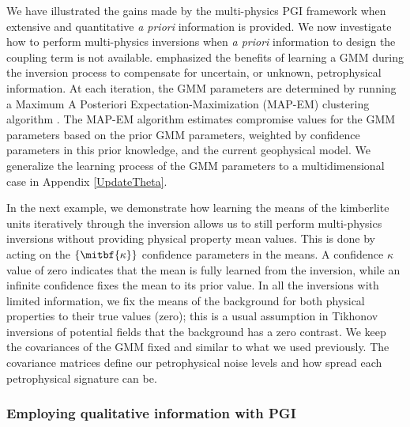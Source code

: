 \documentclass[extra, mreferee]{gji_joint} %
\begin{document}
We have illustrated the gains made by the multi-physics PGI framework when extensive and quantitative \textit{a priori} information is provided. We now investigate how to perform multi-physics inversions when \textit{a priori} information to design the coupling term is not available. \citet{ggz389} emphasized the benefits of learning a GMM during the inversion process to compensate for uncertain, or unknown, petrophysical information. At each iteration, the GMM parameters are determined by running a Maximum A Posteriori Expectation-Maximization (MAP-EM) clustering algorithm \citep{ExpectationMaximization}. The MAP-EM algorithm estimates compromise values for the GMM parameters based on the prior GMM parameters, weighted by confidence parameters in this prior knowledge, and the current geophysical model. We generalize the learning process of the GMM parameters to a multidimensional case in Appendix \ref{UpdateTheta}.

In the next example, we demonstrate how learning the means of the kimberlite units iteratively through the inversion allows us to still perform multi-physics inversions without providing physical property mean values. This is done by acting on the $\{\mitbf{\kappa}\}$ confidence parameters in the means. A confidence $\kappa$ value of zero indicates that the mean is fully learned from the inversion, while an infinite confidence fixes the mean to its prior value. In all the inversions with limited information, we fix the means of the background for both physical properties to their true values (zero); this is a usual assumption in Tikhonov inversions of potential fields that the background has a zero contrast. We keep the covariances of the GMM fixed and similar to what we used previously. The covariance matrices define our petrophysical noise levels and how spread each petrophysical signature can be.

\subsubsection{Employing qualitative information with PGI} \label{sec:InterpreterAssumption}
\end{document}

